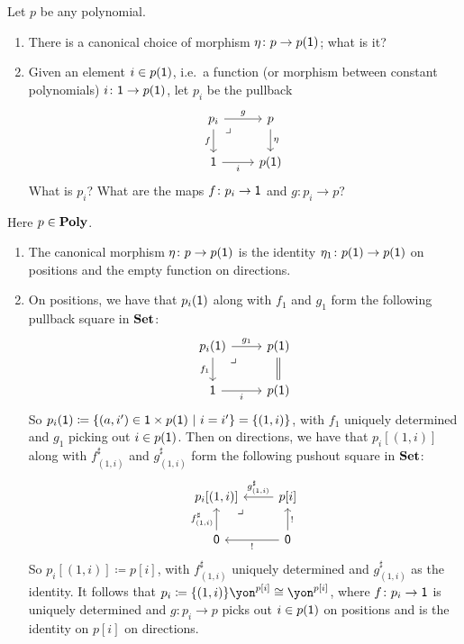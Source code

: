 \documentclass[Book-Poly]{subfiles}
\begin{document}
\begin{exercise}
Let $p$ be any polynomial.
\begin{enumerate}
	\item There is a canonical choice of morphism $\eta\colon p\to p(\textsf{1})$; what is it?
	\item Given an element $i\in p(\textsf{1})$, i.e.\ a function (or morphism between constant polynomials) $i\colon\textsf{1}\to p(\textsf{1})$, let $p_i$ be the pullback
	\[
	\begin{tikzcd}
	p_i\ar[r, "g"]\ar[d, "f"']&
	p\ar[d, "\eta"]\\
	\1\ar[r, "i"']&
	p(\1)\ar[ul, phantom, very near end, "\lrcorner"]
	\end{tikzcd}
	\]
	What is $p_i$? What are the maps $f \colon p_i \to \textsf{1}$ and $g \colon p_i \to p$? \qedhere
\end{enumerate}
\begin{solution}
Here $p \in \mathbf{Poly}$.
\begin{enumerate}
    \item The canonical morphism $\eta \colon p \to p(\textsf{1})$ is the identity $\eta_1 \colon p(\textsf{1}) \to p(\textsf{1})$ on positions and the empty function on directions.
    
    \item On positions, we have that $p_i(\textsf{1})$ along with $f_1$ and $g_1$ form the following pullback square in $\mathbf{Set}$:
    \[
	\begin{tikzcd}
    	p_i(\1) \ar[r, "g_1"] \ar[d, "f_1"'] &
    	p(\1) \ar[d, equals] \\
    	\1 \ar[r, "i"'] &
    	p(\1) \ar[ul, phantom, very near end, "\lrcorner"]
	\end{tikzcd}
	\]
	So $p_i(\textsf{1}) \coloneqq \{(a, i') \in \textsf{1} \times p(\textsf{1}) \ | \ i = i' \} = \{(1, i)\}$, with $f_1$ uniquely determined and $g_1$ picking out $i \in p(\textsf{1})$.
	Then on directions, we have that $p_i[(1,i)]$ along with $f^\sharp_{(1,i)}$ and $g^\sharp_{(1,i)}$ form the following pushout square in $\mathbf{Set}$:
	\[
	\begin{tikzcd}
    	p_i[(1,i)] \ar[from=r, "g^\sharp_{(1,i)}"'] \ar[from=d, "f^\sharp_{(1,i)}"] &
    	p[i] \ar[from=d, "!"'] \\
    	\0 \ar[from=r, "!"] &
    	\0 \ar[ul, phantom, very near end, "\lrcorner"]
    \end{tikzcd}
    \]
    So $p_i[(1,i)] \coloneqq p[i]$, with $f^\sharp_{(1,i)}$ uniquely determined and $g^\sharp_{(1,i)}$ as the identity.
    It follows that $p_i \coloneqq \{(1,i)\}\yon^{p[i]} \iso \yon^{p[i]}$, where $f \colon p_i \to \textsf{1}$ is uniquely determined and $g \colon p_i \to p$ picks out $i \in p(\textsf{1})$ on positions and is the identity on $p[i]$ on directions.
\end{enumerate}
\end{solution}
\end{exercise}
\end{document}
